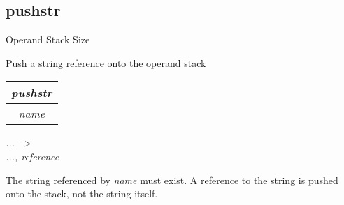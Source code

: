 \documentclass[12pt]{article}
\begin{document}
		\subsection*{pushstr}
			\begin{labeling}{Operand Stack Size}
				\item [\textbf{Operation}] Push a string reference onto the operand stack
				\item [\textbf{Format}] \begin{tabular}{| c |} \hline \textit{pushstr} \\ \hline \textit{name} \\ \hline \end{tabular}
				\item [\textbf{Operand Stack}] \textit{... --\textgreater} \\
										\textit{..., reference}
				\item [\textbf{Description}] The string referenced by \textit{name} must exist. A reference to the string is pushed onto the stack, not the string itself. 
			\end{labeling}	
		\newpage
	
\end{document}
